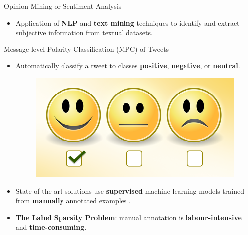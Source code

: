 \documentclass[handout]{beamer}
\begin{document}
\begin{frame}{Opinion Mining or Sentiment Analysis}
\begin{scriptsize}\begin{itemize}
 \item Application of \textbf{NLP} and \textbf{text mining} techniques to identify and extract subjective information from textual datasets.
\end{itemize}

\begin{block}{Message-level Polarity Classification (MPC) of Tweets}
  \begin{itemize}
   \item Automatically classify a tweet to classes \textcolor[rgb]{0.00,0.00,1.00}{\textbf{positive}}, \textcolor[rgb]{1.00,0.00,0.00}{\textbf{negative}}, or \textcolor[rgb]{0.00,1.00,0.00}{\textbf{neutral}}. 
   
     \begin{figure}[h]
        	\includegraphics[scale = 0.15]{pics/sent.png}
        \end{figure}
   
   \item State-of-the-art solutions use \textbf{supervised} machine learning models trained from \textbf{manually} annotated examples \cite{NRCJAIR14}.
  \item \textbf{The Label Sparsity Problem}: manual annotation is \textbf{labour-intensive} and \textbf{time-consuming}. 
  \end{itemize} 
\end{block}

\end{scriptsize}

\end{frame}
\end{document}
